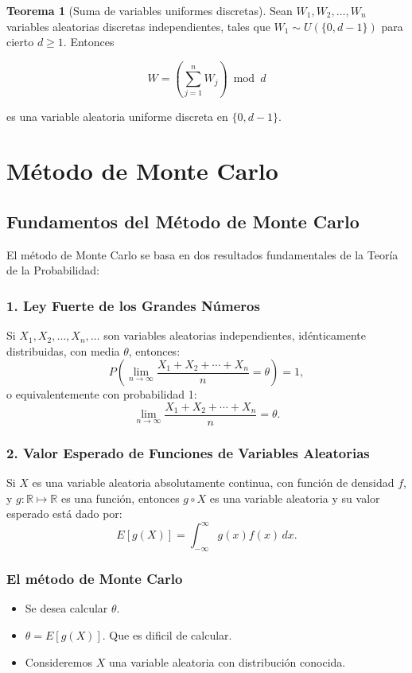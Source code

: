 \documentclass[11pt, a4paper]{article}
\theoremstyle{definition}
\newtheorem{theorem}{Teorema}
\begin{document}
\begin{theorem}[Suma de variables uniformes discretas]
    Sean $W_{1}, W_{2}, \ldots, W_{n}$ variables aleatorias discretas independientes, tales que $W_{1} \sim U(\{0,d-1\})$ para cierto $d \geq 1$. Entonces
    
    \[
    W = \left(\sum_{j=1}^{n} W_{j}\right) \bmod d
    \]
    
    es una variable aleatoria uniforme discreta en $\{0, d-1\}$.
    \end{theorem}

\section{Método de Monte Carlo}

\subsection{Fundamentos del Método de Monte Carlo}
El método de Monte Carlo se basa en dos resultados fundamentales de la Teoría de la Probabilidad:

\subsubsection*{1. Ley Fuerte de los Grandes Números}
Si $X_1, X_2, \ldots, X_n, \ldots$ son variables aleatorias independientes, idénticamente distribuidas, con media $\theta$, entonces:
\[
P\left(\lim_{n \to \infty} \frac{X_1 + X_2 + \cdots + X_n}{n} = \theta\right) = 1,
\]
o equivalentemente con probabilidad 1:
\[
\lim_{n \to \infty} \frac{X_1 + X_2 + \cdots + X_n}{n} = \theta.
\]

\subsubsection*{2. Valor Esperado de Funciones de Variables Aleatorias}
Si $X$ es una variable aleatoria absolutamente continua, con función de densidad $f$, y $g : \mathbb{R} \mapsto \mathbb{R}$ es una función, entonces $g \circ X$ es una variable aleatoria y su valor esperado está dado por:
\[
E[g(X)] = \int_{-\infty}^{\infty} g(x)f(x) \, dx.
\]

\subsubsection*{El método de Monte Carlo}

\begin{itemize}
    \item Se desea calcular $\theta$.
    \item $\theta = E[g(X)]$. Que es dificil de calcular.
    \item Consideremos $X$ una variable aleatoria con distribución conocida.
\end{itemize}
\end{document}
